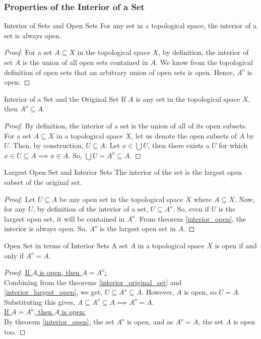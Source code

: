 \subsubsection{Properties of the Interior of a Set}
\begin{Theorem}{Interior of Sets and Open Sets}\label{interior_open}
    For any set in a topological space, the interior of a set is always open.
\end{Theorem}
\begin{proof}
    For a set $A\subseteq X$ in the topological space $X$, by definition, the interior of set $A$ is the union of all open sets contained in $A$. We know from the topological definition of open sets that an arbitrary union of open sets is open. Hence, $A^o$ is open.
\end{proof}
\begin{Theorem}{Interior of a Set and the Original Set}\label{interior_original_set}
    If $A$ is any set in the topological space $X$, then $A^o\subseteq A$.
\end{Theorem}
\begin{proof}
    By definition, the interior of a set is the union of all of its open subsets. For a set $A\subseteq X$ in a topological space $X$, let us denote the open subsets of $A$ by $U$. Then, by construction, $U\subseteq A$. Let $x\in\bigcup U$, then there exists a $U$ for which $x\in U\subseteq A\implies x\in A$. So, $\bigcup U=A^o\subseteq A$.
\end{proof}
\begin{Theorem}{Largest Open Set and Interior Sets}\label{interior_largest_open}
    The interior of the set is the largest open subset of the original set.
\end{Theorem}
\begin{proof}
    Let $U\subseteq A$ be any open set in the topological space $X$ where $A\subseteq X$. Now, for any $U$, by definition of the interior of a set, $U\subseteq A^o$. So, even if $U$ is the largest open set, it will be contained in $A^o$. From theorem \eqref{interior_open}, the interior is always open. So, $A^o$ is the largest open set in $A$.
\end{proof}
\begin{Theorem}{Open Set in terms of Interior Sets}\label{open_sets_in_terms_of_interior_set}
    A set $A$ in a topological space $X$ is open if and only if $A^o=A$.
\end{Theorem}
\begin{proof}
    \underline{If $A$ is open, then $A=A^o$:}\\
    Combining from  the theorems \eqref{interior_original_set} and \eqref{interior_largest_open}, we get, $U\subseteq A^o\subseteq A$. However, $A$ is open, so $U=A$. Substituting this gives, $A\subseteq A^o\subseteq A\implies A^o=A$.\\
    \underline{If $A=A^o$, then $A$ is open:}\\
    By theorem \eqref{interior_open}, the set $A^o$ is open, and as $A^o=A$, the set $A$ is open too.
\end{proof}
